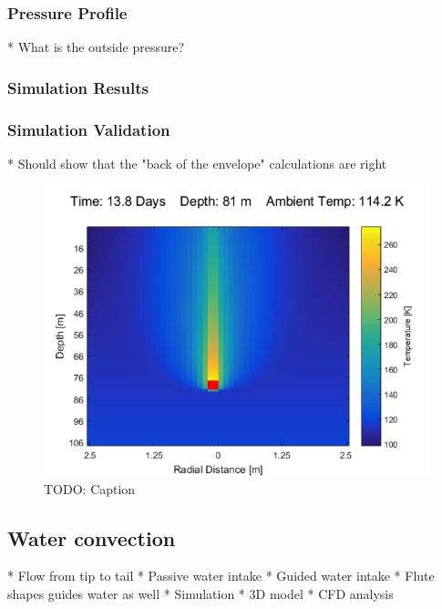 \subsubsection{Pressure Profile}

* What is the outside pressure?

\subsubsection{Simulation Results}

\subsubsection{Simulation Validation}

* Should show that the "back of the envelope" calculations are right

\begin{figure}[htb]
	\centering
	\includegraphics[width=\textwidth]{figures/temperature/temperature_simulation.png}
	\caption{TODO: Caption}
	\label{fig:temperature_simulation}
\end{figure}

\subsection{Water convection}

* Flow from tip to tail
* Passive water intake
	* Guided water intake
	* Flute shapes guides water as well
* Simulation
	* 3D model
	* CFD analysis

